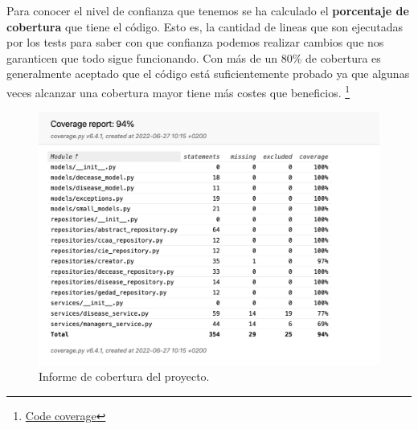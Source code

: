 Para conocer el nivel de confianza que tenemos se ha calculado el \textbf{porcentaje de cobertura}
que tiene el código. Esto es, la cantidad de lineas que son ejecutadas por los tests para
saber con que confianza podemos realizar cambios que nos garanticen que todo sigue
funcionando. Con más de un 80\% de cobertura es generalmente aceptado que el código está
suficientemente probado ya que algunas veces alcanzar una cobertura mayor tiene más costes
que beneficios.
\footnote{\href{https://www.atlassian.com/continuous-delivery/software-testing/code-coverage}{Code
coverage}}

\FloatBarrier
\begin{figure}[h]
	\centering	
	\includegraphics[width=\textwidth]{doc/logos/imgs/cobertura.jpg}
    \caption{ Informe de cobertura del proyecto.}
    \label{fig:cobertura-tests}
\end{figure}
\FloatBarrier


